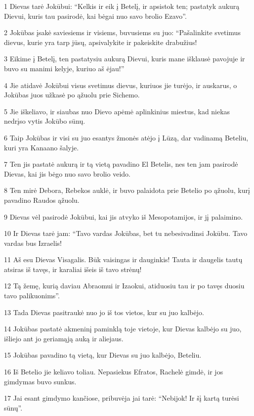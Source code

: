 \par 1 Dievas tarė Jokūbui: “Kelkis ir eik į Betelį, ir apsistok ten; pastatyk aukurą Dievui, kuris tau pasirodė, kai bėgai nuo savo brolio Ezavo”. 
\par 2 Jokūbas įsakė saviesiems ir visiems, buvusiems su juo: “Pašalinkite svetimus dievus, kurie yra tarp jūsų, apsivalykite ir pakeiskite drabužius! 
\par 3 Eikime į Betelį, ten pastatysiu aukurą Dievui, kuris mane išklausė pavojuje ir buvo su manimi kelyje, kuriuo aš ėjau!” 
\par 4 Jie atidavė Jokūbui visus svetimus dievus, kuriuos jie turėjo, ir auskarus, o Jokūbas juos užkasė po ąžuolu prie Sichemo. 
\par 5 Jie iškeliavo, ir siaubas nuo Dievo apėmė aplinkinius miestus, kad niekas nedrįso vytis Jokūbo sūnų. 
\par 6 Taip Jokūbas ir visi su juo esantys žmonės atėjo į Lūzą, dar vadinamą Beteliu, kuri yra Kanaano šalyje. 
\par 7 Ten jis pastatė aukurą ir tą vietą pavadino El Betelis, nes ten jam pasirodė Dievas, kai jis bėgo nuo savo brolio veido. 
\par 8 Ten mirė Debora, Rebekos auklė, ir buvo palaidota prie Betelio po ąžuolu, kurį pavadino Raudos ąžuolu. 
\par 9 Dievas vėl pasirodė Jokūbui, kai jis atvyko iš Mesopotamijos, ir jį palaimino. 
\par 10 Ir Dievas tarė jam: “Tavo vardas Jokūbas, bet tu nebesivadinsi Jokūbu. Tavo vardas bus Izraelis! 
\par 11 Aš esu Dievas Visagalis. Būk vaisingas ir dauginkis! Tauta ir daugelis tautų atsiras iš tavęs, ir karaliai išeis iš tavo strėnų! 
\par 12 Tą žemę, kurią daviau Abraomui ir Izaokui, atiduosiu tau ir po tavęs duosiu tavo palikuonims”. 
\par 13 Tada Dievas pasitraukė nuo jo iš tos vietos, kur su juo kalbėjo. 
\par 14 Jokūbas pastatė akmeninį paminklą toje vietoje, kur Dievas kalbėjo su juo, išliejo ant jo geriamąją auką ir aliejaus. 
\par 15 Jokūbas pavadino tą vietą, kur Dievas su juo kalbėjo, Beteliu. 
\par 16 Iš Betelio jie keliavo toliau. Nepasiekus Efratos, Rachelė gimdė, ir jos gimdymas buvo sunkus. 
\par 17 Jai esant gimdymo kančiose, pribuvėja jai tarė: “Nebijok! Ir šį kartą turėsi sūnų”. 
